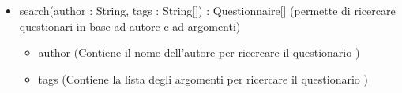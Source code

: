 \begin{description}
\begin{itemize}
\item search(author : String, tags  : String[]) : Questionnaire[] (permette di ricercare questionari in base ad autore e ad argomenti)\begin{itemize}
\item author (Contiene il nome dell'autore per ricercare il questionario )
\item tags  (Contiene la lista degli argomenti per ricercare il questionario )
\end{itemize}

\end{itemize}

\end{description}

\vspace{0.5cm}
\hypertarget{client::controller::student::Menu}{}
